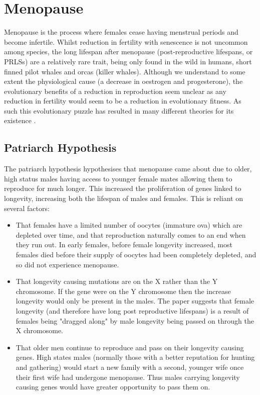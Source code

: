 \documentclass[authoryearcitations]{UoYCSproject}
\begin{document}
\section{Menopause}
Menopause is the process where females cease having menstrual periods and become infertile. Whilst reduction in fertility with senescence is not uncommon among species, the long lifespan after menopause (post-reproductive lifespans, or PRLSs) are a relatively rare trait, being only found in the wild in humans, short finned pilot whales and orcas (killer whales). Although we understand to some extent the physiological cause (a decrease in oestrogen and progesterone), the evolutionary benefits of a reduction in reproduction seem unclear as any reduction in fertility would seem to be a reduction in evolutionary fitness. As such this evolutionary puzzle has resulted in many different theories for its existence \cite{evolutionPRLS2015}.  

\subsection{Patriarch Hypothesis}
The patriarch hypothesis \cite{patriarchHypothesis2000} hypothesises that menopause came about due to older, high status males having access to younger female mates allowing them to reproduce for much longer. This increased the proliferation of genes linked to longevity, increasing both the lifespan of males and females. This is reliant on several factors: 

\begin{itemize}
\item That females have a limited number of oocytes (immature ova) which are depleted over time, and that reproduction naturally comes to an end when they run out. \cite{humanPopBio1994} In early females, before female longevity increased, most females died before their supply of oocytes had been completely depleted, and so did not experience menopause.
\item That longevity causing mutations are on the X rather than the Y chromosome. If the gene were on the Y chromosome then the increase longevity would only be present in the males. The paper suggests that female longevity (and therefore have long post reproductive lifespans) is a result of females being "dragged along" by male longevity being passed on through the X chromosome. 
\item That older men continue to reproduce and pass on their longevity causing genes. High states males (normally those with a better reputation for hunting and gathering) would start a new family with a second, younger wife once their first wife had undergone menopause. Thus males carrying longevity causing genes would have greater opportunity to pass them on.
\end{itemize}
\end{document}
